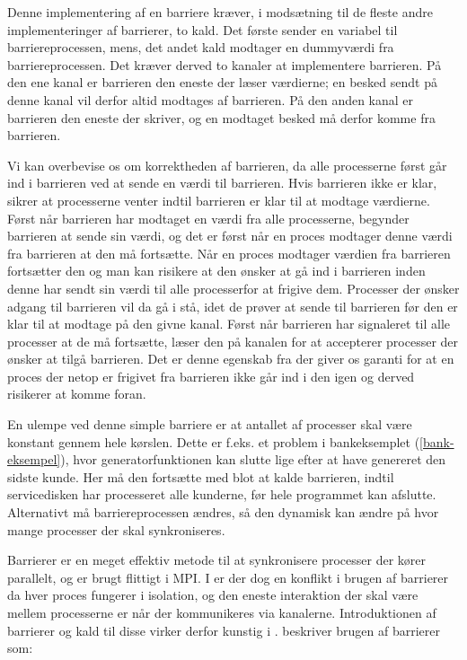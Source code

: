 Denne implementering af en barriere kræver, i modsætning til de fleste andre 
implementeringer af barrierer\cites{mpi-barrier, crew}, to kald. Det første 
sender en variabel til barriereprocessen, mens,
det andet kald modtager en dummyværdi fra barriereprocessen. Det kræver derved 
to kanaler at implementere barrieren. På den ene kanal er barrieren den eneste 
der læser værdierne; en besked sendt på denne kanal vil derfor altid modtages 
af barrieren. På den anden kanal er barrieren den eneste der skriver, og en 
modtaget besked må derfor komme fra barrieren.

Vi kan overbevise os om korrektheden af barrieren, da alle processerne først 
går ind i barrieren ved at sende en værdi til barrieren. Hvis barrieren ikke er 
klar, sikrer \csp at processerne venter indtil barrieren er klar til at modtage 
værdierne. Først når barrieren har modtaget en værdi fra alle processerne, 
begynder barrieren at sende sin værdi, og det er først når en proces modtager 
denne værdi fra barrieren at den må fortsætte. Når en proces modtager værdien 
fra barrieren fortsætter den og man kan risikere at den ønsker at gå ind i 
barrieren inden denne har sendt sin værdi til alle processerfor at frigive dem.
Processer der ønsker adgang til barrieren vil da gå i stå, idet de prøver at 
sende til barrieren før den er klar til at modtage på den givne kanal. Først 
når barrieren har signaleret til alle processer at de må fortsætte, læser den 
på kanalen for at accepterer processer der ønsker at tilgå barrieren. Det er 
denne egenskab fra \csp der giver os garanti for at en proces der netop er 
frigivet fra barrieren ikke går ind i den igen og derved risikerer at komme 
foran. 



En ulempe ved denne simple barriere er at antallet af processer skal være 
konstant gennem hele kørslen.
Dette er f.eks. et problem i bankeksemplet (\cref{bank-eksempel}), hvor 
generatorfunktionen kan slutte lige efter at have genereret den sidste kunde.  
Her må den fortsætte med blot at kalde barrieren, indtil servicedisken har 
processeret alle kunderne, før hele programmet kan afslutte. Alternativt må 
barriereprocessen ændres, så den dynamisk kan ændre på hvor mange processer der 
skal synkroniseres. 


Barrierer er en meget effektiv metode til at synkronisere processer der kører 
parallelt, og er brugt flittigt i MPI. I \csp er der dog en konflikt i brugen 
af barrierer da hver proces fungerer i isolation, og den eneste interaktion der 
skal være mellem processerne er når der kommunikeres via kanalerne. 
Introduktionen af barrierer og kald til disse virker derfor kunstig i \csp. 
\citeauthor{crew} beskriver brugen af barrierer som:

